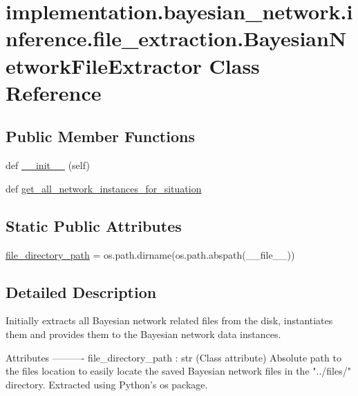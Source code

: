 \hypertarget{classimplementation_1_1bayesian__network_1_1inference_1_1file__extraction_1_1_bayesian_network_file_extractor}{}\section{implementation.\+bayesian\+\_\+network.\+inference.\+file\+\_\+extraction.\+Bayesian\+Network\+File\+Extractor Class Reference}
\label{classimplementation_1_1bayesian__network_1_1inference_1_1file__extraction_1_1_bayesian_network_file_extractor}
\subsection*{Public Member Functions}
\begin{DoxyCompactItemize}
\item 
def \hyperlink{classimplementation_1_1bayesian__network_1_1inference_1_1file__extraction_1_1_bayesian_network_file_extractor_a05d96648417a4fa30b980dd1c114b529}{\+\_\+\+\_\+init\+\_\+\+\_\+} (self)
\item 
def \hyperlink{classimplementation_1_1bayesian__network_1_1inference_1_1file__extraction_1_1_bayesian_network_file_extractor_a085433463af9f4908c9d21f2ab4eb548}{get\+\_\+all\+\_\+network\+\_\+instances\+\_\+for\+\_\+situation}
\end{DoxyCompactItemize}
\subsection*{Static Public Attributes}
\begin{DoxyCompactItemize}
\item 
\hyperlink{classimplementation_1_1bayesian__network_1_1inference_1_1file__extraction_1_1_bayesian_network_file_extractor_accbb2223f0fc75ba78cb2dee69d651f0}{file\+\_\+directory\+\_\+path} = os.\+path.\+dirname(os.\+path.\+abspath(\+\_\+\+\_\+file\+\_\+\+\_\+))
\end{DoxyCompactItemize}


\subsection{Detailed Description}
\begin{DoxyVerb}Initially extracts all Bayesian network related files from the disk, instantiates them and provides them to the
Bayesian network data instances.

Attributes
----------
file_directory_path : str
    (Class attribute) Absolute path to the files location to easily locate the saved Bayesian network files in the
    "../files/" directory. Extracted using Python's os package.
\end{DoxyVerb}
 

